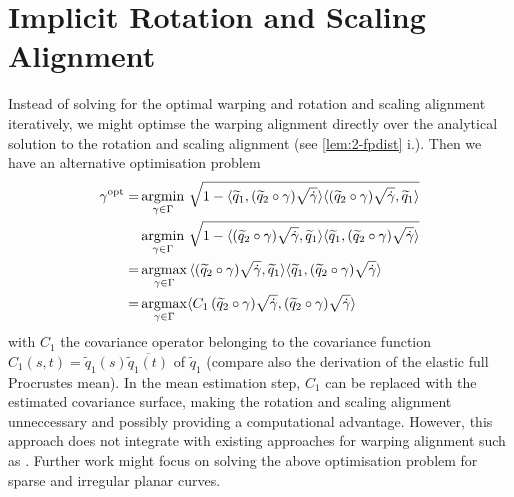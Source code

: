 \section{Implicit Rotation and Scaling Alignment}
\label{app:a-warping}
Instead of solving for the optimal warping and rotation and scaling alignment iteratively, we might optimse the warping alignment directly over the analytical solution to the rotation and scaling alignment (see \cref{lem:2-fpdist} i.).
Then we have an alternative optimisation problem
\begin{align*}
  \gamma^\mathrm{opt} = & \operatorname*{argmin}_{\gamma \in \Gamma}\, \sqrt{1 - \langle \widetilde q_1, (\widetilde q_2  \circ \gamma ) \sqrt{\dot\gamma} \rangle \langle (\widetilde q_2 \circ \gamma) \sqrt{\dot\gamma}, \widetilde q_1 \rangle } \\
    & \operatorname*{argmin}_{\gamma \in \Gamma} \, \sqrt{1 - \langle (\widetilde q_2  \circ \gamma ) \sqrt{\dot\gamma}, \widetilde q_1 \rangle \langle \widetilde q_1, (\widetilde q_2 \circ \gamma) \sqrt{\dot\gamma} \rangle } \\
    = & \operatorname*{argmax}_{\gamma \in \Gamma} \, \langle (\widetilde q_2  \circ \gamma ) \sqrt{\dot\gamma}, \widetilde q_1 \rangle \langle \widetilde q_1, (\widetilde q_2 \circ \gamma) \sqrt{\dot\gamma} \rangle \\
    = & \operatorname*{argmax}_{\gamma \in \Gamma} \langle C_1 \, (\widetilde q_2 \circ \gamma ) \sqrt{\dot \gamma}, (\widetilde q_2 \circ \gamma)\sqrt{\dot\gamma} \rangle
\end{align*}
with $C_1$ the covariance operator belonging to the covariance function $C_1(s,t) = \widetilde q_1(s) \overline{\widetilde q_1 (t)}$ of $\widetilde q_1$ (compare also the derivation of the elastic full Procrustes mean).
In the mean estimation step, $C_1$ can be replaced with the estimated covariance surface, making the rotation and scaling alignment unneccessary and possibly providing a computational advantage.
However, this approach does not integrate with existing approaches for warping alignment such as \cite{Steyer2021}.
Further work might focus on solving the above optimisation problem for sparse and irregular planar curves.

